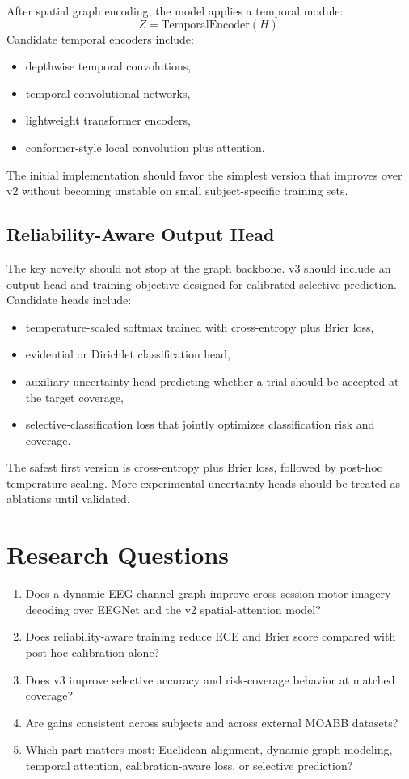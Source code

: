 \documentclass[11pt]{article}
\begin{document}
After spatial graph encoding, the model applies a temporal module:
\[
  Z = \mathrm{TemporalEncoder}(H).
\]
Candidate temporal encoders include:
\begin{itemize}
  \item depthwise temporal convolutions,
  \item temporal convolutional networks,
  \item lightweight transformer encoders,
  \item conformer-style local convolution plus attention.
\end{itemize}
The initial implementation should favor the simplest version that improves
over v2 without becoming unstable on small subject-specific training sets.

\subsection{Reliability-Aware Output Head}

The key novelty should not stop at the graph backbone. v3 should include an
output head and training objective designed for calibrated selective
prediction. Candidate heads include:
\begin{itemize}
  \item temperature-scaled softmax trained with cross-entropy plus Brier loss,
  \item evidential or Dirichlet classification head,
  \item auxiliary uncertainty head predicting whether a trial should be
  accepted at the target coverage,
  \item selective-classification loss that jointly optimizes classification
  risk and coverage.
\end{itemize}
The safest first version is cross-entropy plus Brier loss, followed by
post-hoc temperature scaling. More experimental uncertainty heads should be
treated as ablations until validated.

\section{Research Questions}

\begin{enumerate}
  \item Does a dynamic EEG channel graph improve cross-session motor-imagery
  decoding over EEGNet and the v2 spatial-attention model?
  \item Does reliability-aware training reduce ECE and Brier score compared
  with post-hoc calibration alone?
  \item Does v3 improve selective accuracy and risk-coverage behavior at
  matched coverage?
  \item Are gains consistent across subjects and across external MOABB
  datasets?
  \item Which part matters most: Euclidean alignment, dynamic graph modeling,
  temporal attention, calibration-aware loss, or selective prediction?
\end{enumerate}
\end{document}
